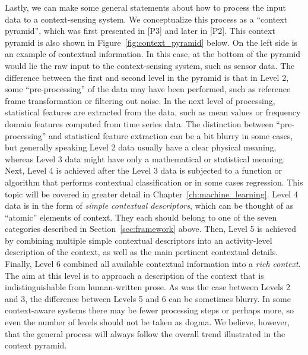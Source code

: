 Lastly, we can make some general statements about how to process the input data to a context-sensing system. We conceptualize this process as a ``context pyramid'', which was first presented in [P3] and later in [P2]. This context pyramid is also shown in Figure~\ref{fig:context_pyramid} below. On the left side is an example of contextual information. In this case, at the bottom of the pyramid would lie the raw input to the context-sensing system, such as sensor data. The difference between the first and second level in the pyramid is that in Level 2, some ``pre-processing'' of the data may have been performed, such as reference frame transformation or filtering out noise. In the next level of processing, statistical features are extracted from the data, such as mean values or frequency domain features computed from time series data. The distinction between ``pre-processing'' and statistical feature extraction can be a bit blurry in some cases, but generally speaking Level 2 data usually have a clear physical meaning, whereas Level 3 data might have only a mathematical or statistical meaning. Next, Level 4 is achieved after the Level 3 data is subjected to a function or algorithm that performs contextual classification or in some cases regression. This topic will be covered in greater detail in Chapter~\ref{ch:machine_learning}. Level 4 data is in the form of \emph{simple contextual descriptors}, which can be thought of as ``atomic'' elements of context. They each should belong to one of the seven categories described in Section~\ref{sec:framework} above. Then, Level 5 is achieved by combining multiple simple contextual descriptors into an activity-level description of the context, as well as the main pertinent contextual details. Finally, Level 6 combined all available contextual information into a \emph{rich context}. The aim at this level is to approach a description of the context that is indistinguishable from human-written prose. As was the case between Levels 2 and 3, the difference between Levels 5 and 6 can be sometimes blurry. In some context-aware systems there may be fewer processing steps or perhaps more, so even the number of levels should not be taken as dogma. We believe, however, that the general process will always follow the overall trend illustrated in the context pyramid.


